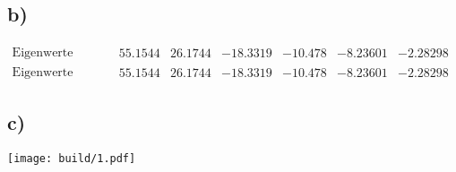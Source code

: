 \subsection{b)}
\begin{align}
\text{Eigenwerte (Lanczos): } &
  \begin{matrix}
    55.1544 &
    26.1744 &
   -18.3319 &
    -10.478 &
   -8.23601 &
   -2.28298
  \end{matrix}\\
\text{Eigenwerte (Eigen):} &
\begin{matrix}
   55.1544&
   26.1744&
  -18.3319&
   -10.478&
  -8.23601&
  -2.28298
\end{matrix}
\end{align}

\subsection{c)}
\texttt{[image: build/1.pdf]}

